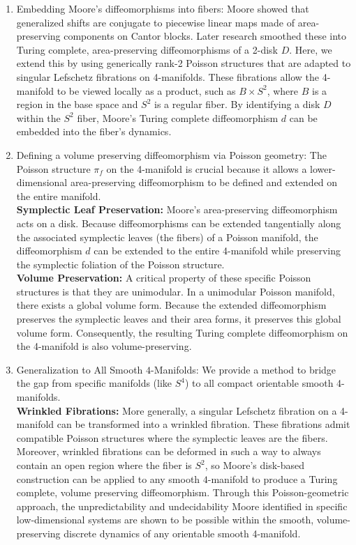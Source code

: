 \documentclass{amsart}
\begin{document}
 \begin{enumerate}
 \item Embedding Moore’s diffeomorphisms into fibers:
 Moore showed that generalized shifts are conjugate to piecewise linear maps made of area-preserving components on Cantor blocks. Later research smoothed these into Turing complete, area-preserving diffeomorphisms of a 2-disk $D$.
Here, we extend this by using generically rank-2 Poisson structures that are adapted to singular Lefschetz fibrations on 4-manifolds. 
These fibrations allow the 4-manifold to be viewed locally as a product, such as $B\times S^2$, where $B$ is a region in the base space and $S^2$ is a regular fiber. 
By identifying a disk $D$ within the $S^2$ fiber, Moore’s Turing complete diffeomorphism $d$ can be embedded into the fiber's dynamics.\\


\item Defining a volume preserving diffeomorphism via Poisson geometry:
The Poisson structure $\pi_{f}$  on the 4-manifold is crucial because it allows a lower-dimensional area-preserving diffeomorphism to be defined and extended on the entire manifold.\\
{\bf Symplectic Leaf Preservation:} Moore’s area-preserving diffeomorphism acts on a disk. 
Because diffeomorphisms can be extended tangentially along the associated symplectic leaves (the fibers) of a Poisson manifold, the diffeomorphism $d$ can be extended to the entire 4-manifold while preserving the symplectic foliation of the Poisson structure.\\
{\bf  Volume Preservation:} A critical property of these specific Poisson structures is that they are unimodular. In a unimodular Poisson manifold, there exists a global volume form. Because the extended diffeomorphism preserves the symplectic leaves and their area forms, it preserves this global volume form. Consequently, the resulting Turing complete diffeomorphism on the 4-manifold is also volume-preserving.\\


 \item Generalization to All Smooth $4$-Manifolds:
We provide a method to bridge the gap from specific manifolds (like $S^4$) to all compact orientable smooth 4-manifolds.\\

{\bf  Wrinkled Fibrations:} More generally, a singular Lefschetz fibration on a 4-manifold can be transformed into a wrinkled fibration. 
These fibrations admit compatible Poisson structures where the symplectic leaves are the fibers. 
Moreover, wrinkled fibrations can be deformed in such a way to always contain an open region where the fiber is $S^2$, so Moore’s disk-based construction can be applied to any smooth $4$-manifold to produce a Turing complete, volume preserving diffeomorphism.
Through this Poisson-geometric approach, the unpredictability and undecidability Moore identified in specific low-dimensional systems are shown to be possible within the smooth, volume-preserving discrete dynamics of any orientable smooth 4-manifold.

\end{enumerate}
\end{document}
